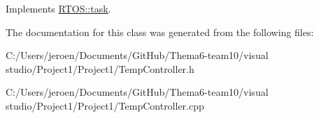 Implements \hyperlink{class_r_t_o_s_1_1task_addc6d52f8792ddba1158d7ae5ef0037d}{R\+T\+O\+S\+::task}.



The documentation for this class was generated from the following files\+:\begin{DoxyCompactItemize}
\item 
C\+:/\+Users/jeroen/\+Documents/\+Git\+Hub/\+Thema6-\/team10/visual studio/\+Project1/\+Project1/Temp\+Controller.\+h\item 
C\+:/\+Users/jeroen/\+Documents/\+Git\+Hub/\+Thema6-\/team10/visual studio/\+Project1/\+Project1/Temp\+Controller.\+cpp\end{DoxyCompactItemize}
